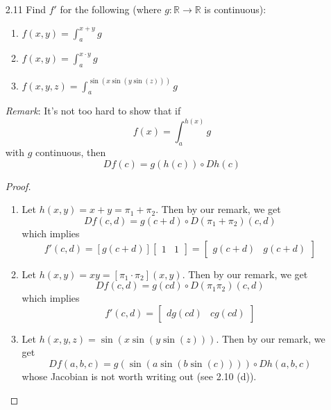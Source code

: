 \begin{enumerate}
    \item[2.11] Find \( f' \) for the following (where \( g: \mathbb{R} \rightarrow \mathbb{R} \) is continuous):
    \begin{enumerate}
        \item \( f(x,y) = \int_{a}^{x+y}g \)
        
        \item \( f(x,y) = \int_{a}^{x\cdot y}g \)
        
        \item \( f(x,y,z) = \int_{a}^{\sin(x \sin(y \sin(z)))}g \)
    \end{enumerate}
    
    \emph{Remark}: It's not too hard to show that if
    \[
    f(x) = \int_a^{h(x)} g
    \]
    with \( g \) continuous, then
    \[
    Df(c) = g(h(c)) \circ Dh(c)
    \]
    
    \begin{proof}
    \begin{enumerate}
        \item Let \( h(x,y) = x+y = \pi_1 + \pi_2 \). Then by our remark, we get
        \[
        Df(c,d) = g(c+d) \circ D(\pi_1+\pi_2)(c,d)
        \]
        which implies
        \[
        f'(c,d) = \left[ g(c+d) \right] \left[ \begin{array}{cc} 1 & 1 \end{array}\right] = \left[ \begin{array}{cc} g(c+d) & g(c+d) \end{array}\right]
        \]
        
        \item Let \( h(x,y) = xy = [\pi_1 \cdot \pi_2] (x,y) \). Then by our remark, we get
        \[
        Df(c,d) = g(cd) \circ D(\pi_1\pi_2)(c,d)
        \]
        which implies
        \[
        f'(c,d) = \left[ \begin{array}{cc} dg(cd) & cg(cd)  \end{array} \right]
        \]
        
        \item Let \( h(x,y,z) = \sin(x \sin(y \sin(z))) \). Then by our remark, we get
        \[
        Df(a,b,c) = g(\sin(a \sin(b \sin(c)))) \circ Dh(a,b,c)
        \]
        whose Jacobian is not worth writing out (see 2.10 (d)).
    \end{enumerate}
    \end{proof}
    

\end{enumerate}
